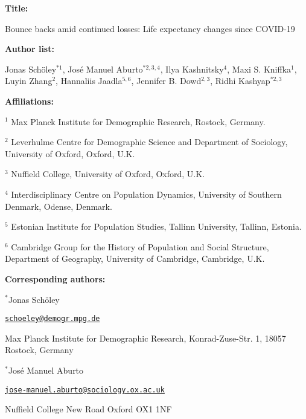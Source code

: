 \documentclass[12pt]{article}
\begin{document}
\begin{titlepage}


{\textbf{Title:}\par
Bounce backs amid continued losses: Life expectancy changes since COVID-19
\par\medskip}

{\textbf{Author list:}\par
Jonas Schöley$^{*1}$,
José Manuel Aburto$^{*2,3,4}$,
Ilya Kashnitsky$^{4}$,
Maxi S. Kniffka$^1$,
Luyin Zhang$^2$,
Hannaliis Jaadla$^{5,6}$,
Jennifer B. Dowd$^{2,3}$,
Ridhi Kashyap$^{*2,3}$
\par\medskip}

{\textbf{Affiliations:}\par
$^1$ Max Planck Institute for Demographic Research, Rostock, Germany.\par
$^2$ Leverhulme Centre for Demographic Science and Department of Sociology, University of Oxford, Oxford, U.K.\par
$^3$ Nuffield College, University of Oxford, Oxford, U.K.\par
$^4$ Interdisciplinary Centre on Population Dynamics, University of Southern Denmark, Odense, Denmark.\par
$^5$ Estonian Institute for Population Studies, Tallinn University, Tallinn, Estonia.\par
$^6$ Cambridge Group for the History of Population and Social Structure, Department of Geography, University of Cambridge, Cambridge, U.K.\par
\par\medskip}

{\textbf{Corresponding authors:}\par

$^{*}$Jonas Schöley

\href{mailto:schoeley@demogr.mpg.de}{\texttt{schoeley@demogr.mpg.de}}

Max Planck Institute for Demographic Research,
Konrad-Zuse-Str. 1,
18057 Rostock, Germany


\vspace{1em}

$^{*}$José Manuel Aburto

\href{mailto:jose-manuel.aburto@sociology.ox.ac.uk}{\texttt{jose-manuel.aburto@sociology.ox.ac.uk}}

Nuffield College
New Road
Oxford OX1 1NF

}
\end{titlepage}
\end{document}
